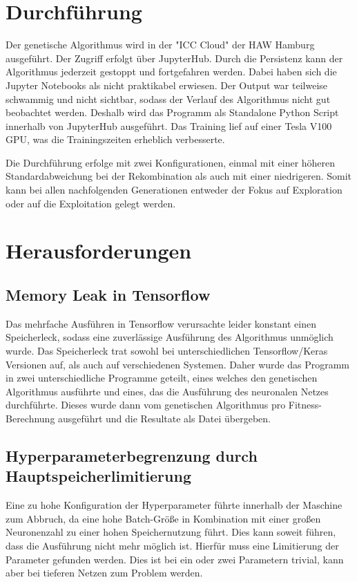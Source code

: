 \section{Durchführung}
Der genetische Algorithmus wird in der "ICC Cloud" der HAW Hamburg ausgeführt. Der Zugriff erfolgt über JupyterHub. Durch die Persistenz kann der Algorithmus jederzeit gestoppt und fortgefahren werden. Dabei haben sich die Jupyter Notebooks als nicht praktikabel erwiesen. Der Output war teilweise schwammig und nicht sichtbar, sodass der Verlauf des Algorithmus nicht gut beobachtet werden. Deshalb wird das Programm als Standalone Python Script innerhalb von JupyterHub ausgeführt. Das Training lief auf einer Tesla V100 GPU, was die Trainingszeiten erheblich verbesserte.

Die Durchführung erfolge mit zwei Konfigurationen, einmal mit einer höheren Standardabweichung bei der Rekombination als auch mit einer niedrigeren. Somit kann bei allen nachfolgenden Generationen entweder der Fokus auf Exploration oder auf die Exploitation gelegt werden.

\section{Herausforderungen}
\subsection{Memory Leak in Tensorflow}
Das mehrfache Ausführen in Tensorflow verursachte leider konstant einen Speicherleck, sodass eine zuverlässige Ausführung des Algorithmus unmöglich wurde. Das Speicherleck trat sowohl bei unterschiedlichen Tensorflow/Keras Versionen auf, als auch auf verschiedenen Systemen. Daher wurde das Programm in zwei unterschiedliche Programme geteilt, eines welches den genetischen Algorithmus ausführte und eines, das die Ausführung des neuronalen Netzes durchführte. Dieses wurde dann vom genetischen Algorithmus pro Fitness-Berechnung ausgeführt und die Resultate als Datei übergeben. 
\subsection{Hyperparameterbegrenzung durch Hauptspeicherlimitierung}
Eine zu hohe Konfiguration der Hyperparameter führte innerhalb der Maschine zum Abbruch, da eine hohe Batch-Größe in Kombination mit einer großen Neuronenzahl zu einer hohen Speichernutzung führt. Dies kann soweit führen, dass die Ausführung nicht mehr möglich ist. Hierfür muss eine Limitierung der Parameter gefunden werden. Dies ist bei ein oder zwei Parametern trivial, kann aber bei tieferen Netzen zum Problem werden.